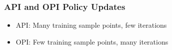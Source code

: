 \documentclass{beamer}
\begin{document}
\begin{frame}
\frametitle{API and OPI Policy Updates}
\begin{itemize}
\item API: Many training sample points, few iterations
\item OPI: Few training sample points, many iterations
\end{itemize}
\end{frame}
\end{document}
